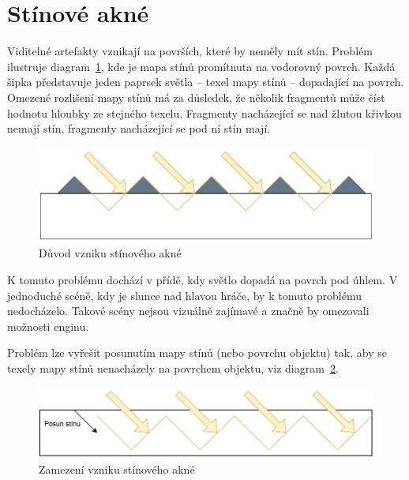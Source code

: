 \documentclass[thesis=M,czech]{FITthesis}[2019/12/23]
\begin{document}
\section{Stínové akné}

Viditelné artefakty vznikají na površích, které by neměly mít stín. Problém ilustruje diagram~\ref{fig:shadows_diag_acne}, kde je mapa stínů promítnuta na vodorovný povrch. Každá šipka představuje jeden paprsek světla -- texel mapy stínů -- dopadající na povrch. Omezené rozlišení mapy stínů má za důsledek, že několik fragmentů může číst hodnotu hloubky ze stejného texelu. Fragmenty nacházející se nad žlutou křivkou nemají stín, fragmenty nacházející se pod ní stín mají. 

\begin{figure}\centering
	\includegraphics[width=\textwidth]{images/shadows/diag_acne}
	\caption[Důvod vzniku stínového akné]{Důvod vzniku stínového akné}\label{fig:shadows_diag_acne}
\end{figure}

K tomuto problému dochází v přídě, kdy světlo dopadá na povrch pod úhlem. V jednoduché scéně, kdy je slunce nad hlavou hráče, by k tomuto problému nedocházelo. Takové scény nejsou vizuálně zajímavé a značně by omezovali možnosti enginu.

Problém lze vyřešit posunutím mapy stínů (nebo povrchu objektu) tak, aby se texely mapy stínů nenacházely na povrchem objektu, viz diagram~\ref{fig:shadows_diag_acne_fix}.

\begin{figure}\centering
	\includegraphics[width=\textwidth]{images/shadows/diag_acne_fix}
	\caption[Zamezení vzniku stínového akné]{Zamezení vzniku stínového akné}\label{fig:shadows_diag_acne_fix}
\end{figure}
\end{document}
